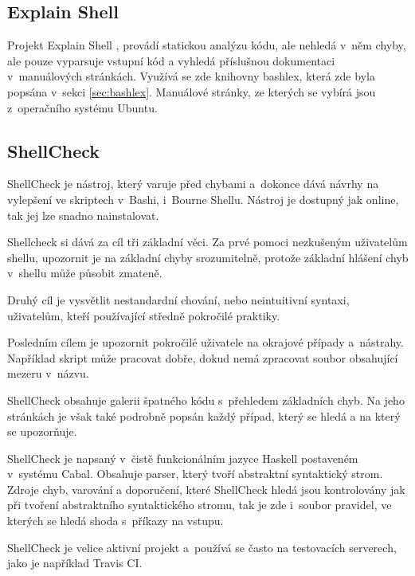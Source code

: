 \documentclass[thesis=M,czech]{FITthesis}[2012/06/26]
\begin{document}
%
%
\subsection{Explain Shell}

Projekt Explain Shell \cite{explainshell}, provádí statickou analýzu kódu, ale nehledá v~něm chyby, ale pouze vyparsuje vstupní kód a vyhledá příslušnou dokumentaci v~manuálových stránkách. Využívá se zde knihovny bashlex, která zde byla popsána v~sekci \ref{sec:bashlex}. Manuálové stránky, ze kterých se vybírá jsou z~operačního systému Ubuntu.


%
%
\subsection{ShellCheck}

ShellCheck \cite{shellcheck} je nástroj, který varuje před chybami a~dokonce dává návrhy na vylepšení ve skriptech v~Bashi, i~Bourne Shellu. Nástroj je dostupný jak online, tak jej lze snadno nainstalovat.

Shellcheck si dává za cíl tři základní věci. Za prvé pomoci nezkušeným uživatelům shellu, upozornit je na základní chyby srozumitelně, protože základní hlášení chyb v~shellu může působit zmateně.

Druhý cíl je vysvětlit nestandardní chování, nebo neintuitivní syntaxi, uživatelům, kteří používající středně pokročilé praktiky.

Posledním cílem je upozornit pokročilé uživatele na okrajové případy a~nástrahy. Například skript může pracovat dobře, dokud nemá zpracovat soubor obsahující mezeru v~názvu.

ShellCheck obsahuje galerii špatného kódu s~přehledem základních chyb. Na jeho stránkách je však také podrobně popsán každý případ, který se hledá a na který se upozorňuje.

ShellCheck je napsaný v~čistě funkcionálním jazyce Haskell \cite{haskell} postaveném v~systému Cabal. Obsahuje parser, který tvoří abstraktní syntaktický strom. Zdroje chyb, varování a doporučení, které ShellCheck hledá jsou kontrolovány jak při tvoření abstraktního syntaktického stromu, tak je zde i~soubor pravidel, ve kterých se hledá shoda s~příkazy na vstupu.

ShellCheck je velice aktivní projekt a~používá se často na testovacích serverech, jako je například Travis CI.
\end{document}

